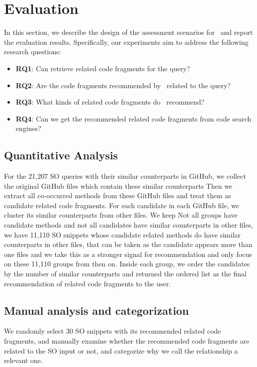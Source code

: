 \section{Evaluation}
\label{sec:eval}



In this section, we describe the design of the assessment scenarios for \tool\ and report the evaluation results. Specifically, our experiments aim to address the following research questions:
\begin{itemize}
	\item \textbf{RQ1}: Can {\tool} retrieve related code fragments for the query?
	\item \textbf{RQ2}: Are the code fragments recommended by \tool\ related to the query?
	\item \textbf{RQ3}: What kinds of related code fragments do \tool\ recommend?
	\item \textbf{RQ4}: Can we get the recommended related code fragments from code search engines?
\end{itemize}

\subsection{Quantitative Analysis}

For the 21,207 SO queries with their similar counterparts in GitHub, we collect the original GitHub files which contain these similar counterparts Then we extract all co-occurred methods from these GitHub files and treat them as candidate related code fragments. For each candidate in each GitHub file, we cluster its similar counterparts from other files. We keep
 Not all groups have candidate methods and not all candidates have similar counterparts in other files, we have 11,110 SO snippets whose candidate related methods do have similar counterparts in other files, that can be taken as the candidate appears more than one files and we take this as a stronger signal for recommendation and only focus on these 11,110 groups from then on. Inside each group, we order the candidates by the number of similar counterparts and returned the ordered list as the final recommendation of related code fragments to the user.


\subsection{Manual analysis and categorization}
We randomly select 30 SO snippets with its recommended related code fragments, and manually examine whether the recommended code fragments are related to the SO input or not, and categorize why we call the relationship a relevant one.


